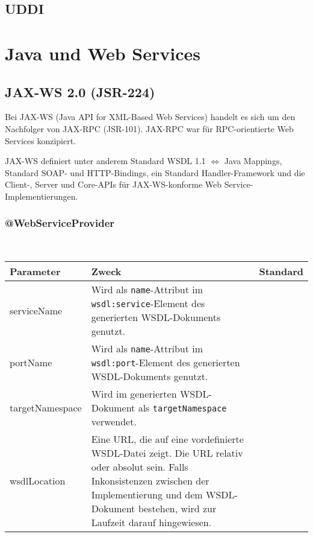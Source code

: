 \documentclass[runningheads]{llncs}
\newcommand{\germanquote}[1]{\glqq{}#1\grqq{}}
\newcommand{\anntabwidth}{\textwidth}
\begin{document}
  \label{uddi}
  \subsection{UDDI}
  \nocite{wk_uddi}


  \label{wsj}
  \section{Java und Web Services}

  \label{jsr224}
  \subsection{JAX-WS 2.0 (JSR-224)}
    Bei JAX-WS\cite{jsr_224} (Java API for XML-Based Web Services) handelt es sich um den Nachfolger von JAX-RPC (JSR-101). JAX-RPC war für RPC-orientierte Web Services konzipiert.

    JAX-WS definiert unter anderem Standard WSDL 1.1 $\Leftrightarrow$ Java Mappings, Standard SOAP- und HTTP-Bindings, ein Standard Handler-Framework und die Client-, Server und Core-APIs für JAX-WS-konforme Web Service-Im\-ple\-men\-tier\-ung\-en.

    \subsubsection{@WebServiceProvider}\ \\
    \tymin=75pt
    \begin{tabulary}{\anntabwidth}{|l|L|L|}
    \hline
    \textbf{Parameter} & \textbf{Zweck} & \textbf{Standard} \\
    \hline
      serviceName &
      Wird als \texttt{name}-Attribut im \texttt{wsdl:service}-Element des generierten WSDL-\linebreak[0]Dokuments genutzt. &
      \germanquote{} \\
    \hline
      portName &
      Wird als \texttt{name}-Attribut im \texttt{wsdl:port}-Element des generierten WSDL-\linebreak[0]Dokuments genutzt. &
      \germanquote{} \\
    \hline
      targetNamespace &
      Wird im generierten WSDL-Dokument als \texttt{targetNamespace} verwendet. &
      \germanquote{} \\
    \hline
      wsdlLocation &
      Eine URL, die auf eine vordefinierte WSDL-Datei zeigt. Die URL relativ oder absolut sein. Falls Inkonsistenzen zwischen der Implementierung und dem WSDL-Dokument bestehen, wird zur Laufzeit darauf hingewiesen. &
      \germanquote{} \\
    \hline
    \end{tabulary}
    \tymin=10pt
\end{document}

